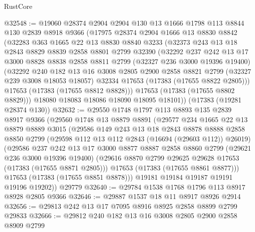 \begin{lexlean}{RustCore}
\begin{coremodule}
@32548 := @19060
    @28374
    @2904
    @2904
    @130
    @13
    @1666
    @1798
    @113
    @8844
    @130
    @2839
    @8918
    @9366
    (@17975
      @28374
      @2904
      @1666
      @13
      @8830
      @8842
      (@32283
        @363
        @1665
        @22
        @13
        @8830
        @8840
        @3233
        (@32373
          @243
          @13
          @18
          @2843
          @8829
          @8839
          @2858
          @8801
          @2799
          @32390
          (@32292
            @237
            @242
            @13
            @17
            @3000
            @8828
            @8838
            @2858
            @8811
            @2799
            (@32327 @236 @3000 @19396 @19400)
            (@32292
              @240
              @182
              @13
              @16
              @3008
              @2805
              @2900
              @2858
              @8821
              @2799
              (@32327 @239 @3008 @18053 @18057)
              @32334
              @17653
              (@17383 (@17655 @8822 @2805)))
            @17653
            (@17383 (@17655 @8812 @8828)))
          @17653
          (@17383 (@17655 @8802 @8829)))
        @18080
        @18083
        @18086
        @18090
        @18095
        @18101))
    (@17383 (@19281 @28374 @130))
@32632 := @29550
    @1748
    @1797
    @113
    @8893
    @135
    @2839
    @8917
    @9366
    (@29560
      @1748
      @13
      @8879
      @8891
      (@29577
        @234
        @1665
        @22
        @13
        @8879
        @8889
        @3015
        (@29586
          @149
          @243
          @13
          @18
          @2843
          @8878
          @8888
          @2858
          @8850
          @2799
          (@29598 @112 @13 @112 @2843 (@16694 (@29603 @112)) @26019)
          (@29586
            @237
            @242
            @13
            @17
            @3000
            @8877
            @8887
            @2858
            @8860
            @2799
            (@29621 @236 @3000 @19396 @19400)
            (@29616 @8870 @2799 @29625 @29628 @17653 (@17383 (@17655 @8871 @2805)))
            @17653
            (@17383 (@17655 @8861 @8877)))
          @17653
          (@17383 (@17655 @8851 @8878)))
        @19181
        @19184
        @19187
        @19191
        @19196
        @19202))
    @29779
@32640 := @29784 @1538 @1768 @1796 @113 @8917 @8928 @2805 @9366
@32646 := @29887 @1537 @18 @11 @8917 @8926 @2914
@32656 := @29813 @242 @13 @17 @7095 @8916 @8925 @2858 @8899 @2799 @29833
@32666 := @29812 @240 @182 @13 @16 @3008 @2805 @2900 @2858 @8909 @2799

\end{coremodule}
\end{lexlean}

